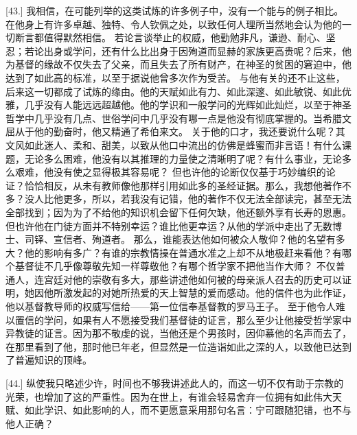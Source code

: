 [43.] 我相信，在可能列举的这类试炼的许多例子中，没有一个能与的例子相比。在他身上有许多卓越、独特、令人钦佩之处，以致任何人理所当然地会认为他的一切断言都值得默然相信。\newline{} 若论言谈举止的权威，他勤勉非凡，谦逊、耐心、坚忍；若论出身或学问，还有什么比出身于因殉道而显赫的家族更高贵呢？后来，他为基督的缘故不仅失去了父亲，而且失去了所有财产，在神圣的贫困的窘迫中，他达到了如此高的标准，以至于据说他曾多次作为受苦。\newline{} 与他有关的还不止这些，后来这一切都成了试炼的缘由。他的天赋如此有力、如此深邃、如此敏锐、如此优雅，几乎没有人能远远超越他。他的学识和一般学问的光辉如此灿烂，以至于神圣哲学中几乎没有几点、世俗学问中几乎没有哪一点是他没有彻底掌握的。当希腊文屈从于他的勤奋时，他又精通了希伯来文。\newline{} 关于他的口才，我还要说什么呢？其文风如此迷人、柔和、甜美，以致从他口中流出的仿佛是蜂蜜而非言语！有什么课题，无论多么困难，他没有以其推理的力量使之清晰明了呢？有什么事业，无论多么艰难，他没有使之显得极其容易呢？\newline{} 但也许他的论断仅仅基于巧妙编织的论证？恰恰相反，从未有教师像他那样引用如此多的圣经证据。那么，我想他著作不多？没人比他更多，所以，若我没有记错，他的著作不仅无法全部读完，甚至无法全部找到；因为为了不给他的知识机会留下任何欠缺，他还额外享有长寿的恩惠。\newline{} 但也许他在门徒方面并不特别幸运？谁比他更幸运？从他的学派中走出了无数博士、司铎、宣信者、殉道者。\newline{} 那么，谁能表达他如何被众人敬仰？他的名望有多大？他的影响有多广？有谁的宗教情操在普通水准之上却不从地极赶来看他？有哪个基督徒不几乎像尊敬先知一样尊敬他？有哪个哲学家不把他当作大师？\newline{} 不仅普通人，连宫廷对他的崇敬有多大，那些讲述他如何被的母亲派人召去的历史可以证明，她因他所激发起的对她所热爱的天上智慧的爱而感动。他的信件也为此作证，他以基督教导师的权威写信给——第一位信奉基督教的罗马王子。\newline{} 至于他令人难以置信的学问，如果有人不愿接受我们基督徒的证言，那么至少让他接受哲学家中异教徒的证言。因为那不敬虔的说，当他还是个男孩时，因仰慕他的名声而去了，在那里看到了他，那时他已年老，但显然是一位造诣如此之深的人，以致他已达到了普遍知识的顶峰。\par

[44.] 纵使我只略述少许，时间也不够我讲述此人的，而这一切不仅有助于宗教的光荣，也增加了这的严重性。因为在世上，有谁会轻易舍弃一位拥有如此伟大天赋、如此学识、如此影响的人，而不更愿意采用那句名言：宁可跟随犯错，也不与他人正确？\par

